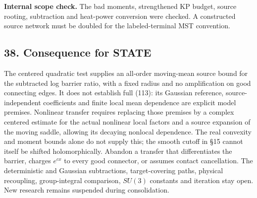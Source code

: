 \documentclass[11pt,a4paper]{article}
\begin{document}
\textbf{Internal scope check.} The bad moments, strengthened KP budget,
source rooting, subtraction and heat-power conversion were checked. A
constructed source network must be doubled for the labeled-terminal MST
convention.

\hypertarget{consequence-for-state}{%
\subsection{38. Consequence for STATE}\label{consequence-for-state}}

The centered quadratic test supplies an all-order moving-mean source
bound for the subtracted log barrier ratio, with a fixed radius and no
amplification on good connecting edges. It does not establish full
(113): its Gaussian reference, source-independent coefficients and
finite local mean dependence are explicit model premises. Nonlinear
transfer requires replacing those premises by a complex centered
estimate for the actual nonlinear local factors and a source expansion
of the moving saddle, allowing its decaying nonlocal dependence. The
real convexity and moment bounds alone do not supply this; the smooth
cutoff in §15 cannot itself be shifted holomorphically. Abandon a
transfer that differentiates the barrier, charges \(e^{cx}\) to every
good connector, or assumes contact cancellation. The deterministic and
Gaussian subtractions, target-covering paths, physical recoupling,
group-integral comparison, \(SU(3)\) constants and iteration stay open.
New research remains suspended during consolidation.
\end{document}
